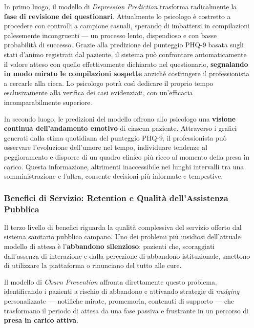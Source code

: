In primo luogo, il modello di \textit{Depression Prediction} trasforma radicalmente la \textbf{fase di revisione dei questionari}. Attualmente lo psicologo è costretto a procedere con controlli a campione casuali, sperando di imbattersi in compilazioni palesemente incongruenti --- un processo lento, dispendioso e con basse probabilità di successo. Grazie alla predizione del punteggio PHQ-9 basata sugli stati d'animo registrati dal paziente, il sistema può confrontare automaticamente il valore atteso con quello effettivamente dichiarato nel questionario, \textbf{segnalando in modo mirato le compilazioni sospette} anziché costringere il professionista a cercarle alla cieca. Lo psicologo potrà così dedicare il proprio tempo esclusivamente alla verifica dei casi evidenziati, con un'efficacia incomparabilmente superiore.

In secondo luogo, le predizioni del modello offrono allo psicologo una \textbf{visione continua dell'andamento emotivo} di ciascun paziente. Attraverso i grafici generati dalla stima quotidiana del punteggio PHQ-9, il professionista può osservare l'evoluzione dell'umore nel tempo, individuare tendenze al peggioramento e disporre di un quadro clinico più ricco al momento della presa in carico. Questa informazione, altrimenti inaccessibile nei lunghi intervalli tra una somministrazione e l'altra, consente decisioni più informate e tempestive.

\subsubsection{Benefici di Servizio: Retention e Qualità dell'Assistenza Pubblica}
\label{subsubsec:benefici_servizio}

Il terzo livello di benefici riguarda la qualità complessiva del servizio offerto dal sistema sanitario pubblico campano. Uno dei problemi più insidiosi dell'attuale modello di attesa è l'\textbf{abbandono silenzioso}: pazienti che, scoraggiati dall'assenza di interazione e dalla percezione di abbandono istituzionale, smettono di utilizzare la piattaforma o rinunciano del tutto alle cure.

Il modello di \textit{Churn Prevention} affronta direttamente questo problema, identificando i pazienti a rischio di abbandono e attivando strategie di \textit{nudging} personalizzate --- notifiche mirate, promemoria, contenuti di supporto --- che trasformano il periodo di attesa da una fase passiva e frustrante in un percorso di \textbf{presa in carico attiva}.

